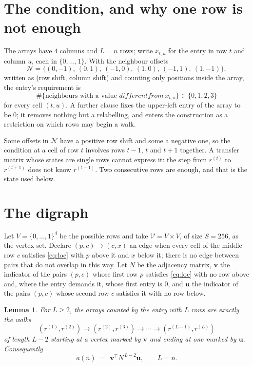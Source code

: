 \documentclass[11pt,a4paper]{article}
\theoremstyle{plain}
\newtheorem{lemma}[theorem]{Lemma}
\theoremstyle{definition}
\begin{document}
\section{The condition, and why one row is not enough}

The arrays have $4$ columns and $L=n$ rows; write $x_{t,u}$ for the entry in
row $t$ and column $u$, each in $\{0,\dots,1\}$. With the neighbour offsets
\[
\mathcal N=\{(0,-1),\ (0,1),\ (-1,0),\ (1,0),\ (-1,1),\ (1,-1)\},
\]
written as (row shift, column shift) and counting only positions inside the array, the
entry's requirement is
\begin{equation}\label{eq:loc}
\#\{\text{neighbours with a value }different from\ x_{t,u}\}\in\{0,1,2,3\}
\end{equation}
for every cell $(t,u)$. A further clause fixes the upper-left entry of the array to be $0$; it removes nothing but a relabelling, and enters the construction as a restriction on which rows may begin a walk.

Some offsets in $\mathcal N$ have a positive row shift and some a negative one, so the
condition at a cell of row $t$ involves rows $t-1$, $t$ and $t+1$ together. A transfer
matrix whose states are single rows cannot express it: the step from $r^{(t)}$ to
$r^{(t+1)}$ does not know $r^{(t-1)}$. Two consecutive rows are enough, and that is
the state used below.

\section{The digraph}

Let $V=\{0,\dots,1\}^{4}$ be the possible rows and take
$\mathcal V=V\times V$, of size $S=256$, as the vertex set. Declare $(p,c)\to(c,x)$ an edge
when every cell of the middle row $c$ satisfies \eqref{eq:loc} with $p$ above it and $x$
below it; there is no edge between pairs that do not overlap in this way. Let $N$ be the
adjacency matrix, $\mathbf{v}$ the indicator of the pairs $(p,c)$ whose first row $p$
satisfies \eqref{eq:loc} with no row above and, where the entry demands it, whose first entry is $0$, and $\mathbf{u}$ the indicator of
the pairs $(p,c)$ whose second row $c$ satisfies it with no row below.

\begin{lemma}\label{lem:walk}
For $L\ge2$, the arrays counted by the entry with $L$ rows are exactly the walks
\[
(r^{(1)},r^{(2)})\to(r^{(2)},r^{(3)})\to\cdots\to(r^{(L-1)},r^{(L)})
\]
of length $L-2$ starting at a vertex marked by $\mathbf{v}$ and ending at one marked by
$\mathbf{u}$. Consequently
\[
a(n)\;=\;\,\mathbf{v}^{\!\top}N^{\,L-2}\mathbf{u},\qquad L=n .
\]
\end{lemma}
\end{document}
